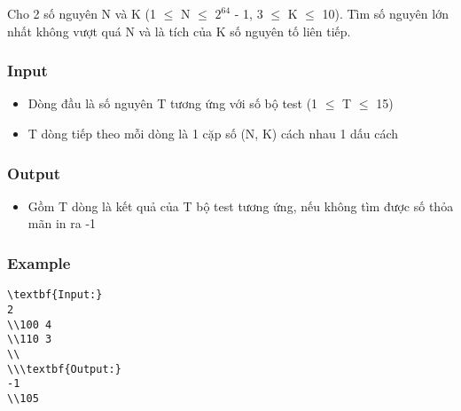



   Cho 2 số nguyên N và K (1  $\le$  N  $\le$  $2^{64}$   - 1, 3  $\le$  K  $\le$  10). Tìm số nguyên lớn nhất không vượt quá N và là tích của K số nguyên tố liên tiếp.  

\subsubsection{   Input  }
\begin{itemize}
	\item     Dòng đầu là số nguyên T tương ứng với số bộ test (1  $\le$  T  $\le$  15)   
	\item     T dòng tiếp theo mỗi dòng là 1 cặp số (N, K) cách nhau 1 dấu cách   
\end{itemize}

\subsubsection{   Output  }
\begin{itemize}
	\item     Gồm T dòng là kết quả của T bộ test tương ứng, nếu không tìm được số thỏa mãn in ra -1   
\end{itemize}

\subsubsection{   Example  }
\begin{verbatim}
\textbf{Input:}
2
\\100 4
\\110 3
\\
\\\textbf{Output:}
-1
\\105 \end{verbatim}
